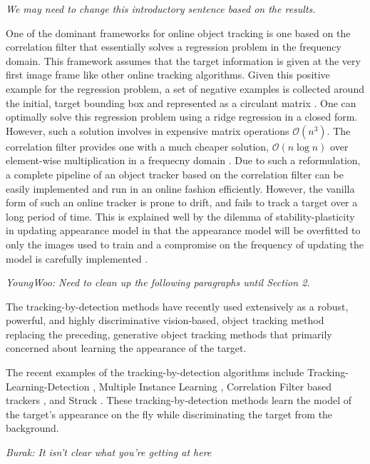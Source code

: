 \documentclass[10pt,twocolumn,letterpaper]{article}
\newcounter{ct}
\begin{document}
{\it We may need to change this introductory sentence based on the
  results.}

One of the dominant frameworks for online object tracking is one based
on the correlation filter that essentially solves a regression problem
in the frequency domain. This framework assumes that the target
information is given at the very first image frame like other online
tracking algorithms. Given this positive example for the regression
problem, a set of negative examples is collected around the initial,
target bounding box and represented as a circulant matrix
\cite{henriques2015high}. One can optimally solve this regression
problem using a ridge regression in a closed form. However, such a
solution involves in expensive matrix operations
$\mathcal{O}(n^{3})$. The correlation filter provides one with a much
cheaper solution, $\mathcal{O}(n\log n)$ over element-wise
multiplication in a frequecny domain
\cite{bolme2010visual,henriques2015high}. Due to such a reformulation,
a complete pipeline of an object tracker based on the correlation
filter can be easily implemented and run in an online fashion
efficiently. However, the vanilla form of such an online tracker is
prone to drift, and fails to track a target over a long period of
time. This is explained well by the dilemma of stability-plasticity in
updating appearance model in that the appearance model will be
overfitted to only the images used to train and a compromise on the
frequency of updating the model is carefully implemented
\cite{santner2010prost}.

{\it YoungWoo: Need to clean up the following paragraphs until Section
  2.}

The tracking-by-detection methods have recently used extensively as a
robust, powerful, and highly discriminative vision-based, object
tracking method replacing the preceding, generative object tracking
methods that primarily concerned about learning the appearance of the
target. 

The recent examples of the tracking-by-detection algorithms include
Tracking-Learning-Detection \cite{kalal2012tracking}, Multiple
Instance Learning \cite{babenko2009visual}, Correlation Filter based
trackers \cite{bolme2010visual,henriques2015high}, and Struck
\cite{hare2012efficient}. These tracking-by-detection methods learn
the model of the target's appearance on the fly while discriminating
the target from the background.

{\it Burak: It isn't clear what you're getting at here} 
\end{document}
